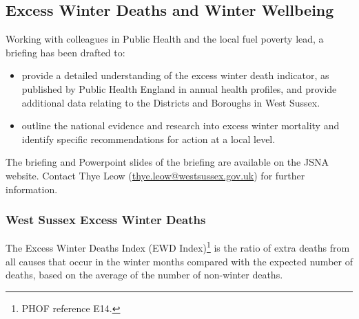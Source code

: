 \subsection{Excess Winter Deaths and Winter Wellbeing}
Working with colleagues in Public Health and the local fuel poverty lead, a briefing has been drafted to:
\begin{itemize}[noitemsep]
    \item provide a detailed understanding of the excess winter death indicator, as published by Public Health England in annual health profiles, and provide additional data relating to the Districts and Boroughs in West Sussex.
    \item outline the national evidence and research into excess winter mortality and identify specific recommendations for action at a local level.
\end{itemize}

The briefing and Powerpoint slides of the briefing are available on the JSNA website. Contact Thye Leow (\url{thye.leow@westsussex.gov.uk}) for further information.

\subsubsection{West Sussex Excess Winter Deaths}
The Excess Winter Deaths Index (EWD Index)\footnote{PHOF reference E14.} is the ratio of extra deaths from all causes that occur in the winter months compared with the expected number of deaths, based on the average of the number of non-winter deaths. 

